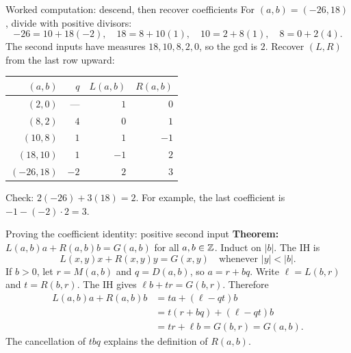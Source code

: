 \begin{frame}{Worked computation: descend, then recover coefficients}
For $(a,b)=(-26,18)$, divide with positive divisors:
\[
 -26=10+18(-2),\quad18=8+10(1),\quad
 10=2+8(1),\quad8=0+2(4).
\]
The second inputs have measures $18,10,8,2,0$, so the gcd is $2$.
Recover $(L,R)$ from the last row upward:
\begin{center}
\begin{tabular}{rrrr}
\toprule
$(a,b)$ & $q$ & $L(a,b)$ & $R(a,b)$\\
\midrule
$(2,0)$ & --- & $1$ & $0$\\
$(8,2)$ & $4$ & $0$ & $1$\\
$(10,8)$ & $1$ & $1$ & $-1$\\
$(18,10)$ & $1$ & $-1$ & $2$\\
$(-26,18)$ & $-2$ & $2$ & $3$\\
\bottomrule
\end{tabular}
\end{center}
Check: $2(-26)+3(18)=2$. For example, the last coefficient is
$-1-(-2)\cdot2=3$.
\end{frame}

\begin{frame}{Proving the coefficient identity: positive second input}
\textbf{Theorem:} $L(a,b)a+R(a,b)b=G(a,b)$ for all $a,b\in\mathbb{Z}$.
Induct on $|b|$. The IH is
\[
 L(x,y)x+R(x,y)y=G(x,y)\quad\text{whenever }|y|<|b|.
\]
If $b>0$, let $r=M(a,b)$ and $q=D(a,b)$, so $a=r+bq$.
Write $\ell=L(b,r)$ and $t=R(b,r)$.
The IH gives $\ell b+tr=G(b,r)$. Therefore
\[
\begin{aligned}
 L(a,b)a+R(a,b)b
 &=ta+(\ell-qt)b\\
 &=t(r+bq)+(\ell-qt)b\\
 &=tr+\ell b=G(b,r)=G(a,b).
\end{aligned}
\]
The cancellation of $tbq$ explains the definition of $R(a,b)$.
\end{frame}


